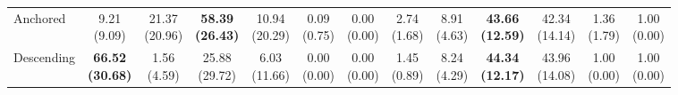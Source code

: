 {\begin{tabular}{l|cccccc|cccccc}
Anchored & \makecell{9.21 \\ (9.09)} & \makecell{21.37 \\ (20.96)} & {\cellcolor[HTML]{C8E6C9}} \bfseries \makecell{58.39 \\ (26.43)} & \makecell{10.94 \\ (20.29)} & \makecell{0.09 \\ (0.75)} & \makecell{0.00 \\ (0.00)} & \makecell{2.74 \\ (1.68)} & \makecell{8.91 \\ (4.63)} & {\cellcolor[HTML]{C8E6C9}} \bfseries \makecell{43.66 \\ (12.59)} & \makecell{42.34 \\ (14.14)} & \makecell{1.36 \\ (1.79)} & \makecell{1.00 \\ (0.00)} \\
Descending & \bfseries \makecell{66.52 \\ (30.68)} & \makecell{1.56 \\ (4.59)} & {\cellcolor[HTML]{C8E6C9}} \makecell{25.88 \\ (29.72)} & \makecell{6.03 \\ (11.66)} & \makecell{0.00 \\ (0.00)} & \makecell{0.00 \\ (0.00)} & \makecell{1.45 \\ (0.89)} & \makecell{8.24 \\ (4.29)} & {\cellcolor[HTML]{C8E6C9}} \bfseries \makecell{44.34 \\ (12.17)} & \makecell{43.96 \\ (14.08)} & \makecell{1.00 \\ (0.00)} & \makecell{1.00 \\ (0.00)} \\
\bottomrule
\end{tabular}
}%
